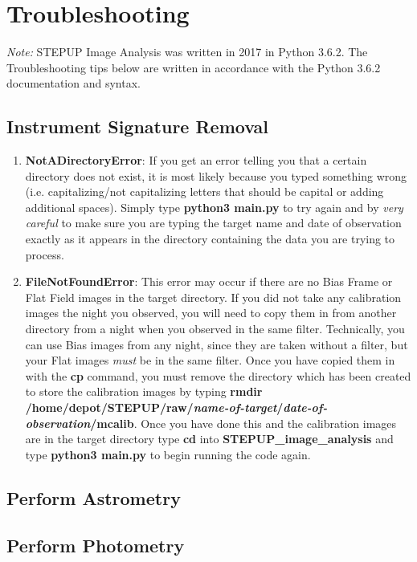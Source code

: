 \documentclass[11pt]{report}
\begin{document}
\chapter{Troubleshooting}
\emph{Note:} STEPUP Image Analysis was written in 2017 in Python 3.6.2. The Troubleshooting tips below are written in accordance with the Python 3.6.2 documentation and syntax. 
\section{Instrument Signature Removal}
\begin{enumerate}
\item {\bf NotADirectoryError}: If you get an error telling you that a certain directory does not exist, it is most likely because you typed something wrong (i.e. capitalizing/not capitalizing letters that should be capital or adding additional spaces). Simply type {\bf python3 main.py} to try again and by \emph{very careful} to make sure you are typing the target name and date of observation exactly as it appears in the directory containing the data you are trying to process.
\item {\bf FileNotFoundError}: This error may occur if there are no Bias Frame or Flat Field images in the target directory. If you did not take any calibration images the night you observed, you will need to copy them in from another directory from a night when you observed in the same filter. Technically, you can use Bias images from any night, since they are taken without a filter, but your Flat images \emph{must} be in the same filter. Once you have copied them in with the {\bf cp} command, you must remove the directory which has been created to store the calibration images by typing {\bf rmdir /home/depot/STEPUP/raw/\emph{name-of-target}/\emph{date-of-observation}/mcalib}. Once you have done this and the calibration images are in the target directory type {\bf cd} into {\bf STEPUP\_image\_analysis} and type {\bf python3 main.py} to begin running the code again.
\end{enumerate}
\section{Perform Astrometry}
\section{Perform Photometry}

\end{document}
